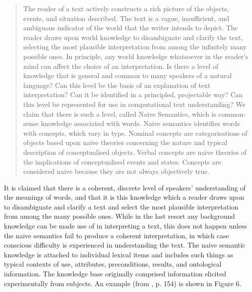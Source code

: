 \newpage
\begin{quote}
  \small
  The reader of a text actively constructs a rich picture of the objects,
  events, and situation described. The text is a vague, insufficient, and
  ambiguous indicator of the world that the writer intends to depict.
  The reader draws upon world knowledge to disambiguate and clarify the
  text, selecting the most plausible interpretation from among the
  infinitely many possible ones. In principle, any world knowledge
  whatsoever in the reader's mind can affect the choice of an
  interpretation. Is there a level of knowledge that is general and
  common to many speakers of a natural language? Can this level be the
  basis of an explanation of text interpretation? Can it be identified in
  a principled, projectable way? Can this level be represented for use in
  computational text understanding? We claim that there is such a level,
  called Naive Semantics, which is common-sense knowledge
  associated with words. Naive semantics identifies words with concepts,
  which vary in type. Nominal concepts are categorisations of objects
  based upon naive theories concerning the nature and typical description
  of conceptualised objects. Verbal concepts are naive theories of the
  implications of conceptualised events and states. Concepts are
  considered naive because they are not always objectively true.
\end{quote}
\vspace*{2mm}
It is claimed that there is a coherent, discrete level of speakers'
understanding of the meanings of words, and that it is this knowledge
which a reader draws upon to disambiguate and clarify a text and select
the most plausible interpretation from among the many possible ones.
While in the last resort any background knowledge can be made use of in
interpreting a text, this does not happen unless the naive semantics
fail to produce a coherent interpretation, in which case conscious
difficulty is experienced in understanding the text. The naive semantic
knowledge
is attached to individual lexical items and includes such things as
typical contexts of use,
attributes, preconditions, results, and ontological information.
The knowledge base originally comprised information elicited
experimentally from subjects.
An example (from \cite{dahlgren:89:a}, p. 154) is shown in Figure 6.

